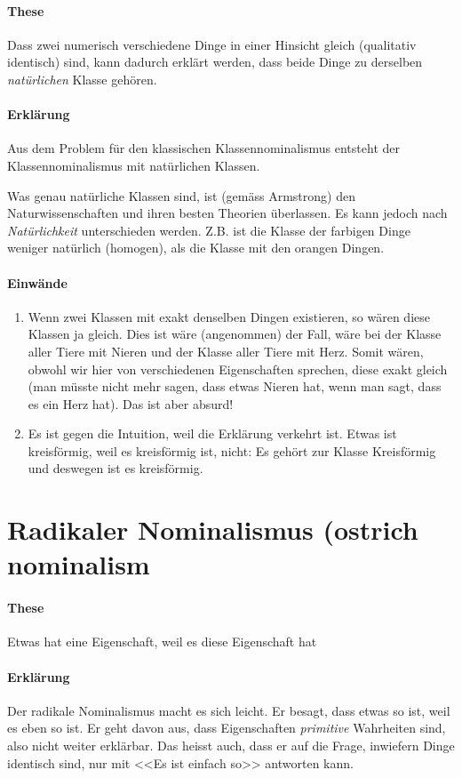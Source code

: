 \documentclass[../main.tex]{subfiles}
\begin{document}
\paragraph{These} Dass zwei numerisch verschiedene Dinge in einer Hinsicht gleich (qualitativ identisch) sind, kann dadurch erklärt werden, dass beide Dinge zu derselben \textit{natürlichen} Klasse gehören. 
\paragraph{Erklärung} Aus dem Problem für den klassischen Klassennominalismus entsteht der Klassennominalismus mit natürlichen Klassen. 

Was genau natürliche Klassen sind, ist (gemäss Armstrong) den Naturwissenschaften und ihren besten Theorien überlassen. Es kann jedoch nach \textit{Natürlichkeit} unterschieden werden. Z.B. ist die Klasse der farbigen Dinge weniger natürlich (homogen), als die Klasse mit den orangen Dingen. 

\paragraph{Einwände}
\begin{enumerate}
	\item Wenn zwei Klassen mit exakt denselben Dingen existieren, so wären diese Klassen ja gleich. Dies ist wäre (angenommen) der Fall, wäre bei der Klasse aller Tiere mit Nieren und der Klasse aller Tiere mit Herz. Somit wären, obwohl wir hier von verschiedenen Eigenschaften sprechen, diese exakt gleich (man müsste nicht mehr sagen, dass etwas Nieren hat, wenn man sagt, dass es ein Herz hat). Das ist aber absurd!
	\item Es ist gegen die Intuition, weil die Erklärung verkehrt ist. Etwas ist kreisförmig, weil es kreisförmig ist, nicht: Es gehört zur Klasse Kreisförmig und deswegen ist es kreisförmig. 
\end{enumerate}

\section{Radikaler Nominalismus (ostrich nominalism}
\paragraph{These} Etwas hat eine Eigenschaft, weil es diese Eigenschaft hat
\paragraph{Erklärung} Der radikale Nominalismus macht es sich leicht. Er besagt, dass etwas so ist, weil es eben so ist. Er geht davon aus, dass Eigenschaften \textit{primitive} Wahrheiten sind, also nicht weiter erklärbar. Das heisst auch, dass er auf die Frage, inwiefern Dinge identisch sind, nur mit <<Es ist einfach so>> antworten kann. 
\end{document}
